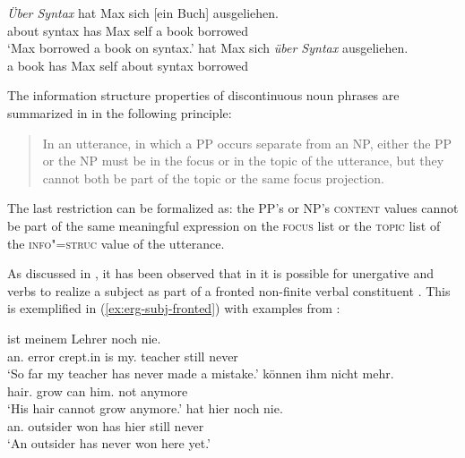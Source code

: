 \documentclass[output=paper
                ,modfonts
                ,nonflat
	        ,collection
	        ,collectionchapter
	        ,collectiontoclongg
 	        ,biblatex
                ,babelshorthands
                ,newtxmath
                ,draftmode
                ,colorlinks, citecolor=brown
]{./langsci/langscibook}
\begin{document}
\begin{exe}
  \ex\label{ex:np-pp} \begin{xlist}
    \ex\label{ex:simple-fronted-pp}\gll \textsl{Über Syntax} hat Max sich [ein
 Buch] ausgeliehen.\\
         {about syntax} has Max self { a} book borrowed\\
       \trans `Max borrowed a book on syntax.'
    \ex\label{ex:simple-fronted-np} hat Max sich \textsl{über Syntax}    ausgeliehen.\\
 \spacebr{}a book has Max self {about syntax} borrowed\\
\end{xlist}
\end{exe}

The information structure properties of discontinuous noun phrases are
summarized in \citet[176]{deKuthy2002a} in the following principle:
\begin{quote}
  In an utterance, in which a PP occurs separate from an NP, either
  the PP or the NP must be in the focus or in the topic of the
  utterance, but they cannot both be part of the topic or the same
  focus projection. \citep[176]{deKuthy2002a}
\end{quote}

The last restriction can be formalized as: the PP's or NP's
\textsc{content} values cannot be part of the same
meaningful expression on the \textsc{focus} list or the \textsc{topic}
list of the \textsc{info"=struc} value of the utterance.

As discussed in \cite{dKM2003a}, it has been observed that in
 it is possible for unergative and  verbs to
realize a subject as part of a fronted non-finite verbal
constituent \citep{Haider90-ohne-crossref}. This is exemplified in (\ref{ex:erg-subj-fronted}) with examples from \citet[94]{Haider90-ohne-crossref}:

\begin{exe}
\ex\label{ex:erg-subj-fronted}
  \begin{xlist}
  \ex\label{ex:erg-subj-fronted-indef} ist meinem Lehrer noch nie.\\
         {\LB}an.\nom{} error {crept.in} is my.\dat{} teacher still never\\
         \trans `So far my teacher has never made a mistake.'
  \ex{} können ihm nicht mehr.\\
          {\LB}hair.\nom{} grow can him.\dat{} not anymore\\
          \trans `His hair cannot grow anymore.'
\ex\label{ex:nonerg-subj-fronted}
       hat hier noch nie.\\
           {\LB}an.\nom{} outsider won has hier still never\\
        \trans `An outsider has never won here yet.' 
  \end{xlist}
\end{exe}
\end{document}
